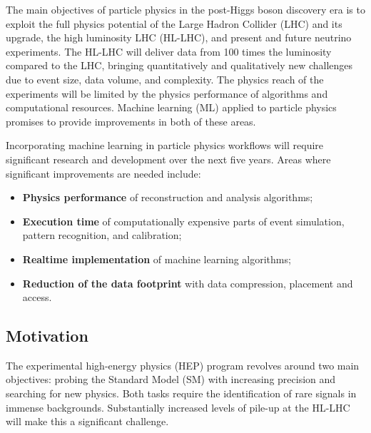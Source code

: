 


The main objectives of particle physics in the post-Higgs boson discovery era is to exploit
the full physics potential of the Large Hadron Collider (LHC) and its upgrade, the high luminosity LHC (HL-LHC), and present and future neutrino experiments. The HL-LHC will deliver data from 100 times the luminosity compared to the LHC, bringing quantitatively and qualitatively new challenges due to event size, data volume, and complexity. The physics reach of the experiments will be limited by the physics performance of algorithms and computational resources. Machine learning (ML) applied to particle physics promises to provide improvements in both of these areas.

Incorporating machine learning in particle physics workflows will require significant research and development over the next five years. Areas where significant improvements are needed include:
\begin{itemize}
 \item {\bf Physics performance} of reconstruction and analysis algorithms;
 \item {\bf Execution time} of computationally expensive parts of event simulation, pattern recognition, and calibration;
 \item {\bf Realtime implementation} of machine learning algorithms;
 \item {\bf Reduction of the data footprint} with data compression, placement and access.
\end{itemize}
\noindent

\subsection{Motivation}
The experimental high-energy physics (HEP) program revolves around two main objectives: probing the Standard Model (SM) with increasing precision and searching for new physics. Both tasks require the identification of rare signals in immense backgrounds. Substantially increased levels of pile-up at the HL-LHC will make this a significant challenge.


